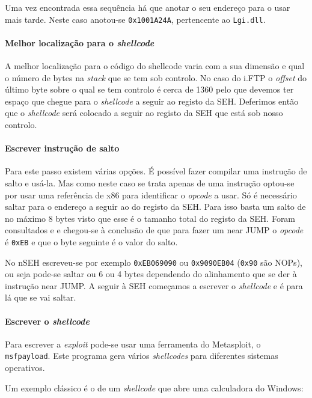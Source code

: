 \documentclass[a4paper]{article}
\begin{document}
Uma vez encontrada essa sequência há que anotar o seu endereço para o usar mais tarde. Neste caso anotou-se \texttt{0x1001A24A}, pertencente ao \texttt{Lgi.dll}.

\paragraph*{Melhor localização para o \textit{shellcode}} A melhor localização para o código do shellcode varia com a sua dimensão e qual o número de bytes na \textit{stack} que se tem sob controlo. No caso do i.FTP o \textit{offset} do último byte sobre o qual se tem controlo é cerca de 1360 pelo que devemos ter espaço que chegue para o \textit{shellcode} a seguir ao registo da SEH. Deferimos então que o \textit{shellcode} será colocado a seguir ao registo da SEH que está sob nosso controlo.

\paragraph*{Escrever instrução de salto} Para este passo existem várias opções. É possível fazer compilar uma instrução de salto e usá-la. Mas como neste caso se trata apenas de uma instrução optou-se por usar uma referência de x86 para identificar o \textit{opcode} a usar. Só é necessário saltar para o endereço a seguir ao do registo da SEH. Para isso basta um salto de no máximo 8 bytes visto que esse é o tamanho total do registo da SEH. Foram consultados \cite{AMD64vol3_2013} e \cite{refx86asm} e chegou-se à conclusão de que para fazer um near JUMP o \textit{opcode} é \texttt{0xEB} e que o byte seguinte é o valor do salto.

No nSEH escreveu-se por exemplo \texttt{0xEB069090} ou \texttt{0x9090EB04} (\texttt{0x90} são NOPs), ou seja pode-se saltar ou 6 ou 4 bytes dependendo do alinhamento que se der à instrução near JUMP. A seguir à SEH começamos a escrever o \textit{shellcode} e é para lá que se vai saltar.

\paragraph*{Escrever o \textit{shellcode}} Para escrever a \textit{exploit} pode-se usar uma ferramenta do Metasploit, o \texttt{msfpayload}. Este programa gera vários \textit{shellcodes} para diferentes sistemas operativos.

Um exemplo clássico é o de um \textit{shellcode} que abre uma calculadora do Windows:
\end{document}

